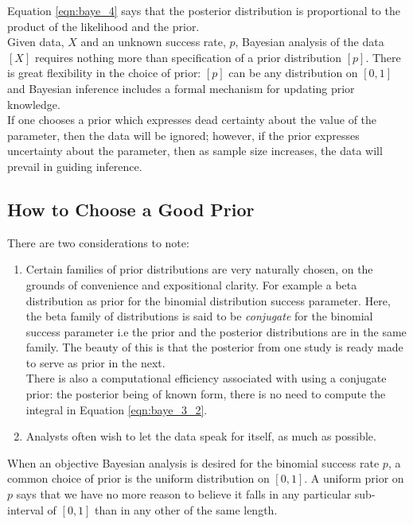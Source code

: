 				Equation \eqref{eqn:baye_4} says that the posterior distribution is proportional to the product of the likelihood and the prior.\\

				Given data, $X$ and an unknown success rate, $p$, Bayesian analysis of the data $[X]$ requires nothing more than specification of a prior distribution $[p]$. There is great flexibility in the choice of prior: $[p]$ can be any distribution on $[0, 1]$ and  Bayesian inference includes a formal mechanism for updating prior knowledge.\\

				If one chooses a prior which expresses dead certainty about the value of the parameter, then the data will be ignored; however, if the prior expresses uncertainty about the parameter, then as sample size increases, the data will prevail in guiding inference.

				\subsection{How to Choose a Good Prior}
				There are two considerations to note:
				\begin{enumerate}
					\item[(i.)] Certain families of prior distributions are very naturally chosen, on the grounds of convenience and expositional clarity. For example a beta distribution as prior for the binomial distribution success parameter. Here, the beta family of distributions is said to be \textit{conjugate} for the binomial success parameter i.e the prior and the posterior distributions are in the same family. The beauty of this is 		that the posterior from one study is ready made to serve as prior in the next.\\
					There is also a computational efficiency associated with using a conjugate prior: the posterior being of known form, there is no need to compute the integral in Equation \eqref{eqn:baye_3_2}.

					\item[(ii.)] Analysts often wish to let the data speak for itself, as much as possible.
				\end{enumerate}

				When an objective Bayesian analysis is desired for the binomial success rate $p$, a common choice of prior is the uniform distribution on $[0, 1]$. A uniform prior on $p$ says that we have no more reason to believe it falls in any particular sub-interval of $[0, 1]$ than in any other of the same length. \cite{link2009bayesian}

